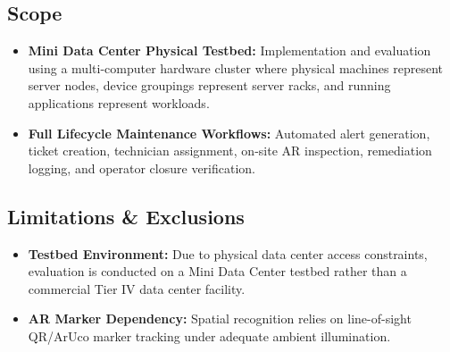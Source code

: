 \subsection{Scope}
\begin{itemize}
    \item \textbf{Mini Data Center Physical Testbed:} Implementation and evaluation using a multi-computer hardware cluster where physical machines represent server nodes, device groupings represent server racks, and running applications represent workloads.
    \item \textbf{Full Lifecycle Maintenance Workflows:} Automated alert generation, ticket creation, technician assignment, on-site AR inspection, remediation logging, and operator closure verification.
\end{itemize}

\subsection{Limitations \& Exclusions}
\begin{itemize}
    \item \textbf{Testbed Environment:} Due to physical data center access constraints, evaluation is conducted on a Mini Data Center testbed rather than a commercial Tier IV data center facility.
    \item \textbf{AR Marker Dependency:} Spatial recognition relies on line-of-sight QR/ArUco marker tracking under adequate ambient illumination.
\end{itemize}
